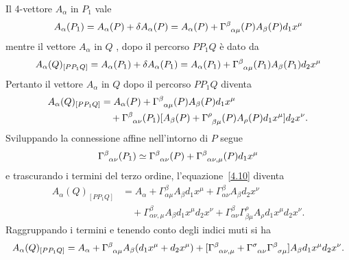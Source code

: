 Il 4-vettore $A_{\alpha}$ in $P_1$ vale
\begin{equation}
  A_{\alpha}(P_1) = A_{\alpha}(P)+ \delta A_{\alpha}(P) = A_{\alpha}(P) +
  \tensor{\Gamma}{^{\beta}_{\alpha \mu}}(P) A_{\beta}(P) d_1 x^{\mu}
\end{equation}
mentre il vettore $A_{\alpha}$ in $Q$ , dopo il percorso $PP_1Q$ è dato da
\begin{equation}
  A_{\alpha}(Q)_{[PP_1Q]} = A_{\alpha}(P_1)+ \delta A_{\alpha}(P_1) =
  A_{\alpha}(P_1) + \tensor{\Gamma}{^{\beta}_{\alpha \mu}}(P_1) A_{\beta}(P_1)
  d_2 x^{\mu}
\end{equation}
Pertanto il vettore $A_{\alpha}$ in $Q$ dopo il percorso $PP_1Q$ diventa
\begin{equation}
  \begin{split}
    A_{\alpha}(Q)_{[PP_1Q]} &= A_{\alpha}(P) +
    \tensor{\Gamma}{^{\beta}_{\alpha\mu}}(P) A_{\beta}(P) d_1 x^{\mu} \\
    &\quad{} + \tensor{\Gamma}{^{\beta}_{\alpha\nu}}(P_1) [ A_{\beta}(P) +
    \tensor{\Gamma}{^{\rho}_{\beta \mu}}(P) A_{\rho}(P) d_1 x^{\mu}] d_2
    x^{\nu}.
    \label{4.10}
  \end{split}
\end{equation}
Sviluppando la connessione affine nell'intorno di $P$ segue
\begin{equation}
  \tensor{\Gamma}{^{\beta}_{\alpha \nu}}(P_1) \simeq
  \tensor{\Gamma}{^{\beta}_{\alpha \nu}}(P) + \tensor{\Gamma}{^{\beta}_{\alpha
      \nu, \mu}}(P)  d_1 x^{\mu}
\end{equation}
e trascurando i termini del terzo ordine, l'equazione~\eqref{4.10} diventa
\begin{equation}
\begin{split}
  A_{\alpha}(Q)_{[PP_1Q]} &= A_{\alpha} + \Gamma^{\beta}_{\alpha \mu} A_{\beta}
  d_1 x^{\mu} + \Gamma^{\beta}_{\alpha \nu} A_{\beta} d_2 x^{\nu} \\
  &\quad{} + \Gamma^{\beta}_{\alpha \nu , \mu} A_{\beta} d_1 x^{\mu} d_2 x^{\nu}
  + \Gamma^{\beta}_{\alpha \nu} \Gamma^{\rho}_{\beta \mu} A_{\rho} d_1 x^{\mu}
  d_2 x^{\nu}.
\end{split}
\end{equation}
Raggruppando i termini e tenendo conto degli indici muti si ha
\begin{equation}
  A_{\alpha}(Q)_{[PP_1Q]} = A_{\alpha} + \tensor{\Gamma}{^{\beta}_{\alpha \mu}}
  A_{\beta} ( d_1 x^{\mu}+d_2 x^{\mu} ) + [ \tensor{\Gamma}{^{\beta}_{\alpha
      \nu, \mu}} + \tensor{\Gamma}{^{\sigma}_{\alpha \nu}}
  \tensor{\Gamma}{^{\beta}_{\sigma \mu}}] A_{\beta} d_1 x^{\mu} d_2 x^{\nu}.
  \label{4.12}
\end{equation}
